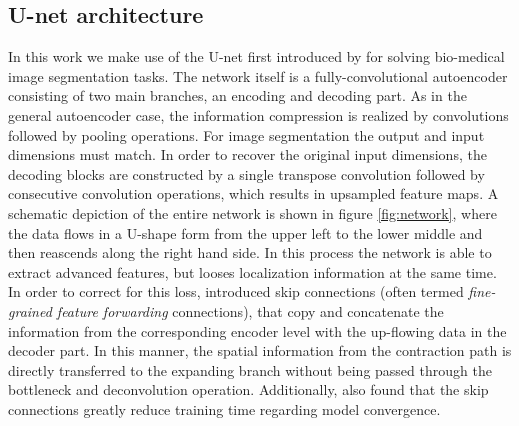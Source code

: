 \documentclass[fleqn,usenatbib]{mnras}
\begin{document}
\subsection{U-net architecture}
In this work we make use of the U-net first introduced by \cite{Ronneberger2015} for solving bio-medical image segmentation tasks. The network itself is a fully-convolutional autoencoder consisting of two main branches, an encoding and decoding part. As in the general autoencoder case, the information compression is realized by convolutions followed by pooling operations. For image segmentation the output and input dimensions must match. In order to recover the original input dimensions, the decoding blocks are constructed by a single transpose convolution followed by consecutive convolution operations, which results in upsampled feature maps. A schematic depiction of the entire network is shown in figure \ref{fig:network}, where the data flows in a U-shape form from the upper left to the lower middle and then reascends along the right hand side. In this process the network is able to extract advanced features, but looses localization information at the same time. In order to correct for this loss, \cite{Ronneberger2015} introduced skip connections (often termed \textit{fine-grained feature forwarding} connections), that copy and concatenate the information from the corresponding encoder level with the up-flowing data in the decoder part. In this manner, the spatial information from the contraction path is directly transferred to the expanding branch without being passed through the bottleneck and deconvolution operation. Additionally, \cite{Ronneberger2015} also found that the skip connections greatly reduce training time regarding model convergence.\par
\end{document}
